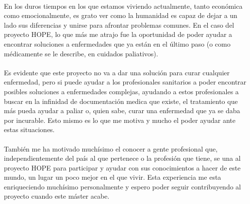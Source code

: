 \paragraph{}
En los duros tiempos en los que estamos viviendo actualmente, tanto económica como emocionalmente, es grato ver como la humanidad es capaz de dejar a un lado sus diferencias y unirse para afrontar problemas comunes. En el caso del proyecto HOPE, lo que más me atrajo fue la oportunidad de poder ayudar a encontrar soluciones a enfermedades que ya están en el último paso (o como médicamente se le describe, en cuidados paliativos).

\paragraph{}
Es evidente que este proyecto no va a dar una solución para curar cualquier enfermedad, pero si puede ayudar a los profesionales sanitarios a poder encontrar posibles soluciones a enfermedades complejas, ayudando a estos profesionales a buscar en la infinidad de documentación medica que existe, el tratamiento que más pueda ayudar a paliar o, quien sabe, curar una enfermedad que ya se daba por incurable. Esto mismo es lo que me motiva y mucho el poder ayudar ante estas situaciones.

\paragraph{}
También me ha motivado muchísimo el conocer a gente profesional que, independientemente del país al que pertenece o la profesión que tiene, se una al proyecto HOPE para participar y ayudar con sus conocimientos a hacer de este mundo, un lugar un poco mejor en el que vivir. Esta experiencia me esta enriqueciendo muchísimo personalmente y espero poder seguir contribuyendo al proyecto cuando este máster acabe.
